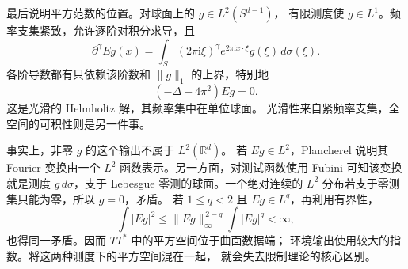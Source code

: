 \ProseParagraphBreak
最后说明平方范数的位置。对球面上的 \(g\in L^2(S^{d-1})\)，
有限测度使 \(g\in L^1\)。频率支集紧致，允许逐阶对积分求导，且
\[
 \partial^\gamma Eg(x)
       =\int_S(2\pi\mathrm i\xi)^\gamma
                  e^{2\pi\mathrm i x\cdot\xi}g(\xi)\,d\sigma(\xi).
\]
各阶导数都有只依赖该阶数和 \(\|g\|_1\) 的上界，特别地
\[
 (-\Delta-4\pi^2)Eg=0.
\]
这是光滑的 Helmholtz 解，其频率集中在单位球面。
光滑性来自紧频率支集，全空间的可积性则是另一件事。

\ProseParagraphBreak
事实上，非零 \(g\) 的这个输出不属于 \(L^2(\mathbb R^d)\)。
若 \(Eg\in L^2\)，Plancherel 说明其 Fourier 变换由一个
\(L^2\) 函数表示。另一方面，对测试函数使用 Fubini 可知该变换就是测度
\(g\,d\sigma\)，支于 Lebesgue 零测的球面。一个绝对连续的 \(L^2\)
分布若支于零测集只能为零，所以 \(g=0\)，矛盾。
若 \(1\leq q<2\) 且 \(Eg\in L^q\)，再利用有界性，
\[
 \int|Eg|^2\leq\|Eg\|_\infty^{\,2-q}\int|Eg|^q<\infty,
\]
也得同一矛盾。因而 \(TT^*\) 中的平方空间位于曲面数据端；
环境输出使用较大的指数。将这两种测度下的平方空间混在一起，
就会失去限制理论的核心区别。
